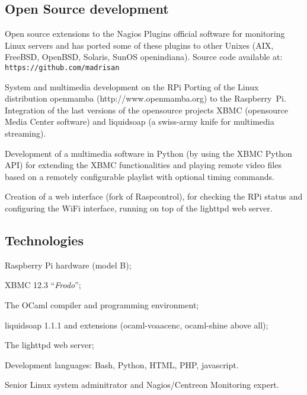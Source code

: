 \subsection{Open Source development}

\noindent
Open source extensions to the 
Nagios Plugins official software for monitoring Linux servers and has ported
some of these plugins to other Unixes (AIX, FreeBSD, OpenBSD, Solaris, 
SunOS openindiana).
Source code available at: {\tt https://github.com/madrisan}


\bigskip
{}
   {System and multimedia development on the RPi}
Porting of the Linux distribution openmamba 
({\rm http:/\negthinspace/www.openmamba.org}) to the Raspberry~Pi.
Integration of the last versions of the opensource projects XBMC 
(opensource Media Center software) and liquidsoap 
(a swiss-army knife for multimedia streaming).

Development of a multimedia software in Python (by using the XBMC Python API)
for extending the XBMC functionalities and playing remote video files based on
a remotely configurable playlist with optional timing commands.

Creation of a web interface (fork of Raspcontrol), for checking the RPi status
and configuring the WiFi interface, running on top of the lighttpd web server.

\subsection{Technologies}

\item{\bdot} Raspberry Pi hardware (model B);
\item{\bdot} XBMC 12.3 ``{\it Frodo\/}'';
\item{\bdot} The OCaml compiler and programming environment;
\item{\bdot} liquidsoap 1.1.1 and extensions (ocaml-voaacenc, ocaml-shine above all);
\item{\bdot} The lighttpd web server;
\item{\bdot} Development languages: Bash, Python, HTML, PHP, javascript.


\bigskip
{}
Senior Linux system adminitrator and Nagios/Centreon Monitoring expert.

